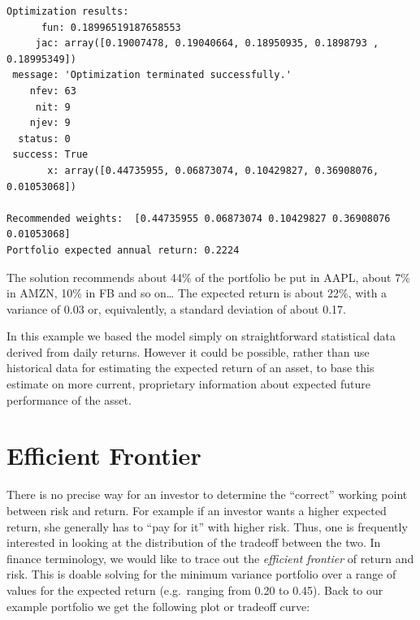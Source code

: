 \begin{tcolorbox}[breakable, size=fbox, boxrule=1pt, pad at break*=1mm,colback=cellbackground, colframe=cellborder]
\begin{Verbatim}[commandchars=\\\{\}]
Optimization results:
      fun: 0.18996519187658553
     jac: array([0.19007478, 0.19040664, 0.18950935, 0.1898793 , 0.18995349])
 message: 'Optimization terminated successfully.'
    nfev: 63
     nit: 9
    njev: 9
  status: 0
 success: True
       x: array([0.44735955, 0.06873074, 0.10429827, 0.36908076, 0.01053068])

Recommended weights:  [0.44735955 0.06873074 0.10429827 0.36908076 0.01053068]
Portfolio expected annual return: 0.2224
    \end{Verbatim}
\end{tcolorbox}

    The solution recommends about 44\% of the portfolio be put in AAPL,
about 7\% in AMZN, 10\% in FB and so on\ldots{} The expected return is
about 22\%, with a variance of 0.03 or, equivalently, a standard
deviation of about 0.17.

In this example we based the model simply on straightforward statistical
data derived from daily returns. However it could be possible, rather
than use historical data for estimating the expected return of an asset,
to base this estimate on more current, proprietary information about
expected future performance of the asset.

\section{Efficient Frontier}\label{efficient-frontier}

There is no precise way for an investor to determine the ``correct''
working point between risk and return. For example if an investor wants
a higher expected return, she generally has to ``pay for it'' with
higher risk. Thus, one is frequently interested in looking at the
distribution of the tradeoff between the two. In finance terminology, we
would like to trace out the \emph{efficient frontier} of return and
risk. This is doable solving for the minimum variance portfolio over a
range of values for the expected return (e.g.~ranging from 0.20 to
0.45). Back to our example portfolio we get the following plot or
tradeoff curve:

